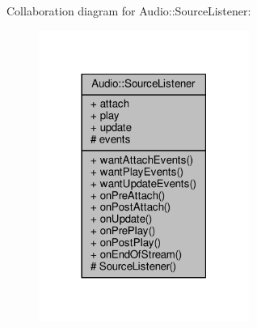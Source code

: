 Collaboration diagram for Audio\+:\+:Source\+Listener\+:
\nopagebreak
\begin{figure}[H]
\begin{center}
\leavevmode
\includegraphics[width=195pt]{da/d1c/classAudio_1_1SourceListener__coll__graph}
\end{center}
\end{figure}
